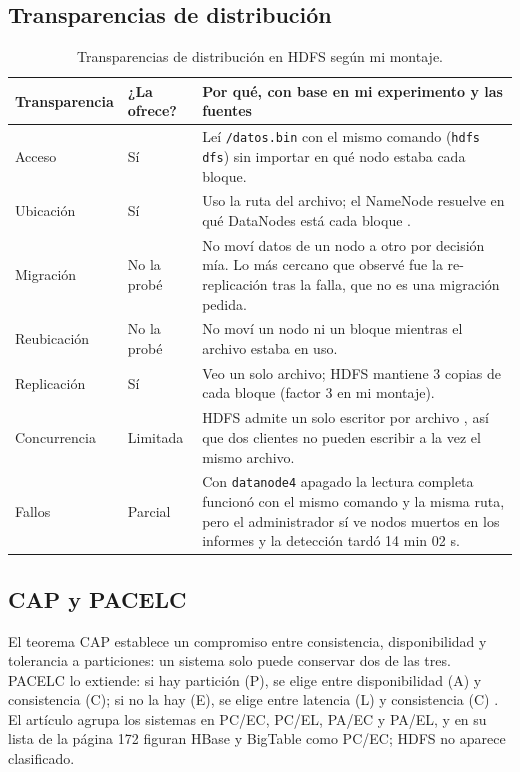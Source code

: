 \documentclass[11pt,a4paper]{article}
\begin{document}
\subsection{Transparencias de distribución}
\begin{table}[H]
\centering\footnotesize
\begin{tabularx}{\textwidth}{@{}>{\raggedright\arraybackslash}p{2.1cm}>{\raggedright\arraybackslash}p{2.3cm}>{\raggedright\arraybackslash}X@{}}
\toprule
Transparencia & ¿La ofrece? & Por qué, con base en mi experimento y las fuentes \\
\midrule
Acceso & Sí & Leí \texttt{/datos.bin} con el mismo comando (\texttt{hdfs dfs}) sin importar en qué nodo estaba cada bloque. \\
Ubicación & Sí & Uso la ruta del archivo; el NameNode resuelve en qué DataNodes está cada bloque \cite{HadoopHDFSDesign}. \\
Migración & No la probé & No moví datos de un nodo a otro por decisión mía. Lo más cercano que observé fue la re-replicación tras la falla, que no es una migración pedida. \\
Reubicación & No la probé & No moví un nodo ni un bloque mientras el archivo estaba en uso. \\
Replicación & Sí & Veo un solo archivo; HDFS mantiene 3 copias de cada bloque (factor 3 en mi montaje). \\
Concurrencia & Limitada & HDFS admite un solo escritor por archivo \cite{HadoopHDFSDesign}, así que dos clientes no pueden escribir a la vez el mismo archivo. \\
Fallos & Parcial & Con \texttt{datanode4} apagado la lectura completa funcionó con el mismo comando y la misma ruta, pero el administrador sí ve nodos muertos en los informes y la detección tardó 14 min 02 s. \\
\bottomrule
\end{tabularx}
\caption{Transparencias de distribución en HDFS según mi montaje.}
\end{table}

\subsection{CAP y PACELC}
El teorema CAP establece un compromiso entre consistencia, disponibilidad y tolerancia a particiones: un sistema solo puede conservar dos de las tres. PACELC lo extiende: si hay partición (P), se elige entre disponibilidad (A) y consistencia (C); si no la hay (E), se elige entre latencia (L) y consistencia (C) \cite{Ahmed2023}. El artículo agrupa los sistemas en PC/EC, PC/EL, PA/EC y PA/EL, y en su lista de la página 172 figuran HBase y BigTable como PC/EC; HDFS no aparece clasificado.
\end{document}
